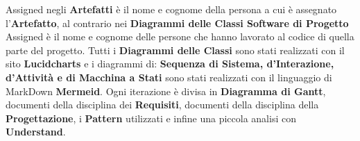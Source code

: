 Assigned negli \textbf{Artefatti} è il nome e cognome della persona a cui è assegnato l'\textbf{Artefatto}, al contrario nei 
\textbf{Diagrammi delle Classi Software di Progetto} Assigned è il nome e cognome delle persone che hanno lavorato al codice
di quella parte del progetto. Tutti i \textbf{Diagrammi delle Classi} sono stati realizzati con il sito \textbf{Lucidcharts} e
i diagrammi di: \textbf{Sequenza di Sistema, d'Interazione, d'Attività e di Macchina a Stati} sono stati realizzati con il 
linguaggio di MarkDown \textbf{Mermeid}.
Ogni iterazione è divisa in \textbf{Diagramma di Gantt}, documenti della disciplina dei \textbf{Requisiti}, documenti della
disciplina della \textbf{Progettazione}, i \textbf{Pattern} utilizzati e infine una piccola analisi con \textbf{Understand}.
